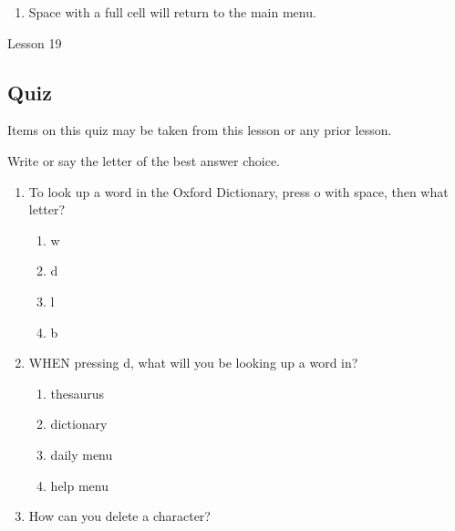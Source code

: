 \documentclass[10pt,letterpaper,twoside]{report}
\begin{document}
{{{{\begin{enumerate}
	\item Space with a full cell will return to the main menu.
\end{enumerate}





\clearpage

\newpage
Lesson 19

\subsection{Quiz}



Items on this quiz may be taken from this lesson or any prior lesson.

Write or say the letter of the best answer choice.



\begin{enumerate}
	\item To look up a word in the Oxford Dictionary, press o with space, then what letter?
	      \begin{enumerate} 

		      \item w
		            
		      \item d
		            
		      \item l
		            
		      \item b
		            
		            
	      \end{enumerate}
	\item WHEN pressing d, what will you be looking up a word in?
	      
	      \begin{enumerate}
		      \item thesaurus
		            
		      \item dictionary
		            
		      \item daily menu
		            
		      \item help menu
		            
		            
	      \end{enumerate}
	\item How can you delete a character?
	      

\end{enumerate}}}}}
\end{document}
